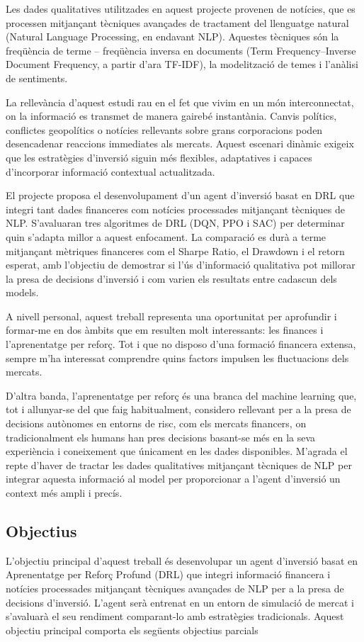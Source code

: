 \documentclass[12pt,a4paper,twoside]{book}
\begin{document}
Les dades qualitatives utilitzades en aquest projecte provenen de notícies, que es processen mitjançant tècniques avançades de tractament del llenguatge natural (Natural Language Processing, en endavant NLP). Aquestes tècniques són la freqüència de terme – freqüència inversa en documents (Term Frequency–Inverse Document Frequency, a partir d'ara TF-IDF), la modelització de temes i l'anàlisi de sentiments.

La rellevància d'aquest estudi rau en el fet que vivim en un món interconnectat, on la informació es transmet de manera gairebé instantània. Canvis polítics, conflictes geopolítics o notícies rellevants sobre grans corporacions poden desencadenar reaccions immediates als mercats. Aquest escenari dinàmic exigeix que les estratègies d'inversió siguin més flexibles, adaptatives i capaces d'incorporar informació contextual actualitzada.

El projecte proposa el desenvolupament d'un agent d'inversió basat en DRL que integri tant dades financeres com notícies processades mitjançant tècniques de NLP. S'avaluaran tres algoritmes de DRL (DQN, PPO i SAC) per determinar quin s'adapta millor a aquest enfocament. La comparació es durà a terme mitjançant mètriques financeres com el Sharpe Ratio, el Drawdown i el retorn esperat, amb l'objectiu de demostrar si l'ús d'informació qualitativa pot millorar la presa de decisions d'inversió i com varien els resultats entre cadascun dels models.

A nivell personal, aquest treball representa una oportunitat per aprofundir i formar-me en dos àmbits que em resulten molt interessants: les finances i l'aprenentatge per reforç. Tot i que no disposo d'una formació financera extensa, sempre m'ha interessat comprendre quins factors impulsen les fluctuacions dels mercats.

D'altra banda, l'aprenentatge per reforç és una branca del machine learning que, tot i allunyar-se del que faig habitualment, considero rellevant per a la presa de decisions autònomes en entorns de risc, com els mercats financers, on tradicionalment els humans han pres decisions basant-se més en la seva experiència i coneixement que únicament en les dades disponibles. M'agrada el repte d'haver de tractar les dades qualitatives mitjançant tècniques de NLP per integrar aquesta informació al model per proporcionar a l'agent d'inversió un context més ampli i precís.

\subsection{Objectius}
L'objectiu principal d'aquest treball és desenvolupar un agent d'inversió basat en Aprenentatge per Reforç Profund (DRL) que integri informació financera i notícies processades mitjançant tècniques avançades de NLP per a la presa de decisions d'inversió. L'agent serà entrenat en un entorn de simulació de mercat i s'avaluarà el seu rendiment comparant-lo amb estratègies tradicionals. Aquest objectiu principal comporta els següents objectius parcials
\end{document}
